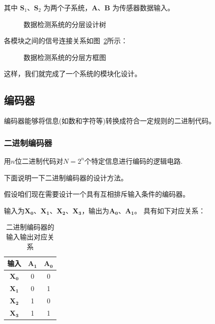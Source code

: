 其中 $\mathbf{S}_1$、$\mathbf{S}_2$ 为两个子系统，$\mathbf{A}$、$\mathbf{B}$ 为传感器数据输入。

\begin{figure}[H]
	\centering
	\resizebox{\textwidth}{!}{}
	\caption{数据检测系统的分层设计树}
	\label{fig:分层设计树}
\end{figure}

各模块之间的信号连接关系如图~\ref{fig:分层方框图}所示：

\begin{figure}[H]
	\centering
	\resizebox{\textwidth}{!}{}
	\caption{数据检测系统的分层方框图}
	\label{fig:分层方框图}
\end{figure}

这样，我们就完成了一个系统的模块化设计。

\subsection{编码器}
编码器能够将信息(如数和字符等)转换成符合一定规则的二进制代码。

\subsubsection{二进制编码器}
用$n$位二进制代码对$N=2^n$个特定信息进行编码的逻辑电路.

下面说明一下二进制编码器的设计方法。

假设咱们现在需要设计一个具有互相排斥输入条件的编码器。

输入为$\mathbf{X_0}$、$\mathbf{X_1}$、$\mathbf{X_2}$、$\mathbf{X_3}$，输出为$\mathbf{A_0}$、$\mathbf{A_1}$。
具有如下对应关系：
\begin{table}[H]
	\centering
	\caption{二进制编码器的输入输出对应关系}
	\label{tab:二进制编码器输入输出对应关系}
	\begin{tabular}{c|cc}
		\toprule
		输入 &$\mathbf{A_1}$  & $\mathbf{A_0}$ \\
		\midrule
		$\mathbf{X_0}$ & 0 & 0 \\
		$\mathbf{X_1}$ & 0 & 1 \\
		$\mathbf{X_2}$ & 1 & 0 \\
		$\mathbf{X_3}$ & 1 & 1 \\
		\bottomrule
	\end{tabular}
\end{table}
